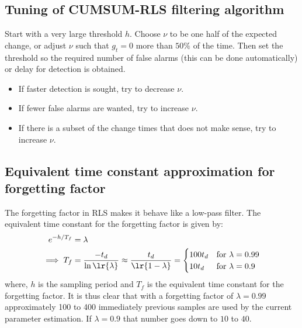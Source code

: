 \subsection{Tuning of CUMSUM-RLS filtering algorithm}
Start with a very large threshold $h$. Choose $\nu$ to be one half of the expected change, or adjust $\nu$ such that $g_t = 0$ more than $50\%$ of the time. Then set the threshold so the required number of false alarms (this can be done automatically) or delay for detection is obtained.
\begin{itemize}
        \item If faster detection is sought, try to decrease $\nu$.
        \item If fewer false alarms are wanted, try to increase $\nu$.
        \item If there is a subset of the change times that does not make sense, try to increase $\nu$.
\end{itemize}

\subsection{Equivalent time constant approximation for forgetting factor}
The forgetting factor in RLS makes it behave like a low-pass filter. The equivalent time constant for the forgetting factor is given by:
\begin{align*}
        e^{-h/T_f} &= \lambda\\
        \implies T_f &= \frac{-t_d}{\ln \lr{\lambda}} \approx \frac{t_d}{\lr{1-\lambda}} = \begin{cases}
                100 t_d & \text{for } \lambda = 0.99\\
                10 t_d & \text{for } \lambda = 0.9
        \end{cases}
\end{align*}
where, $h$ is the sampling period and $T_f$ is the equivalent time constant for the forgetting factor. It is thus clear that with a forgetting factor of $\lambda = 0.99$ approximately 100 to 400 immediately  previous samples are used by the current parameter estimation. If $\lambda = 0.9$ that number goes down to $10$ to $40$.
